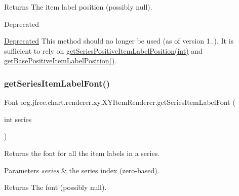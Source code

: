 \begin{DoxyReturn}{Returns}
The item label position (possibly {\ttfamily null}).
\end{DoxyReturn}
\begin{DoxyRefDesc}{Deprecated}
\item[\mbox{\hyperlink{deprecated__deprecated000233}{Deprecated}}]This method should no longer be used (as of version 1..). It is sufficient to rely on \mbox{\hyperlink{interfaceorg_1_1jfree_1_1chart_1_1renderer_1_1xy_1_1_x_y_item_renderer_ad43ae7b5ccf295ef85f6a9960d593c3d}{get\+Series\+Positive\+Item\+Label\+Position(int)}} and \mbox{\hyperlink{interfaceorg_1_1jfree_1_1chart_1_1renderer_1_1xy_1_1_x_y_item_renderer_a9a5bf99da72e6e4c93c3e7dfc087b038}{get\+Base\+Positive\+Item\+Label\+Position()}}. \end{DoxyRefDesc}
\mbox{\label{interfaceorg_1_1jfree_1_1chart_1_1renderer_1_1xy_1_1_x_y_item_renderer_ab71c90261054a6698b53cb96970cca90}} 
\subsubsection{\texorpdfstring{get\+Series\+Item\+Label\+Font()}{getSeriesItemLabelFont()}}
{\footnotesize\ttfamily Font org.\+jfree.\+chart.\+renderer.\+xy.\+X\+Y\+Item\+Renderer.\+get\+Series\+Item\+Label\+Font (\begin{DoxyParamCaption}\item[{int}]{series }\end{DoxyParamCaption})}

Returns the font for all the item labels in a series.


\begin{DoxyParams}{Parameters}
{\em series} & the series index (zero-\/based).\\
\hline
\end{DoxyParams}
\begin{DoxyReturn}{Returns}
The font (possibly {\ttfamily null}). 
\end{DoxyReturn}
\mbox{\label{interfaceorg_1_1jfree_1_1chart_1_1renderer_1_1xy_1_1_x_y_item_renderer_a1e5440f518283fdbc088ce0aad7002c3}} 
